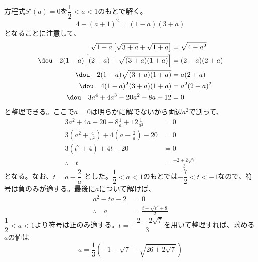 方程式$S'(a)=0$を$\dfrac{1}{2}<a<1$のもとで解く。
\[ 4-(a+1)^2=(1-a)(3+a) \]
となることに注意して、
\begin{align*}
 \sqrt{1-a}\left[\sqrt{3+a}+\sqrt{1+a}\right]&=\sqrt{4-a^2} \\
 \dou\quad 2(1-a)\left[(2+a)+\sqrt{(3+a)(1+a)}\right]&=(2-a)(2+a) \\
 \dou\quad 2(1-a)\sqrt{(3+a)(1+a)}&=a(2+a) \\
 \dou\quad 4(1-a)^2(3+a)(1+a)&=a^2(2+a)^2 \\
 \dou\quad 3a^4+4a^3-20a^2-8a+12&=0
\end{align*}
と整理できる。ここで$a=0$は明らかに解でないから両辺$a^2$で割って、
\begin{align*}
 3a^2+4a-20-8\frac{1}{a}+12\frac{1}{a^2}&=0 \\
 3\left(a^2+\frac{4}{a^2}\right)+4\left(a-\frac{2}{a}\right)-20&=0 \\
 3(t^2+4)+4t-20&=0 \\
 \therefore\quad t&=\frac{-2\pm2\sqrt{7}}{3}
\end{align*}
となる。なお、$t=a-\dfrac{2}{a}$ とした。$\dfrac{1}{2}<a<1$のもとでは$-\dfrac{7}{2}<t<-1$なので、符号は負のみが適する。最後に$a$について解けば、
\begin{align*}
 a^2-ta-2&=0 \\
 \therefore\quad a&=\frac{t\pm\sqrt{t^2+8}}{2}
\end{align*}
$\dfrac{1}{2}<a<1$より符号は正のみ適する。$t=\dfrac{-2-2\sqrt{7}}{3}$を用いて整理すれば、求める$a$の値は
\[ a=\frac{1}{3}\left(-1-\sqrt{7}+\sqrt{26+2\sqrt{7}}\right) \]